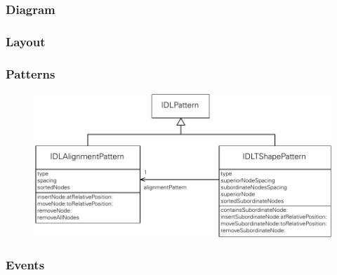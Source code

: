 
\subsubsection{Diagram}
\label{subsubsec:component-diagram}



\subsubsection{Layout}

\subsubsection{Patterns}


\begin{figure}[hbt]
    \centering
    \includegraphics[width=\textwidth]{resources/layout-patterns-implementation}
    \caption{}
    \label{fig:layout-patterns-implementation}
\end{figure}

\subsubsection{Events}

